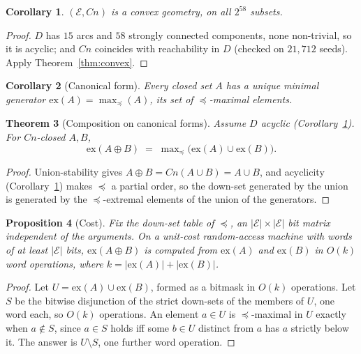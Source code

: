 \documentclass[11pt,reqno]{amsart}
\theoremstyle{plain}
\newtheorem{theorem}{Theorem}[section]
\newtheorem{proposition}[theorem]{Proposition}
\newtheorem{corollary}[theorem]{Corollary}
\theoremstyle{definition}
\theoremstyle{remark}
\newcommand{\El}{\mathcal{E}}
\begin{document}
\begin{corollary}\label{cor:ourconvex}
$(\El, Cn)$ is a convex geometry, on all $2^{58}$ subsets.
\end{corollary}

\begin{proof}
$D$ has $15$ arcs and $58$ strongly connected components, none non-trivial, so it
is acyclic; and $Cn$ coincides with reachability in $D$ (checked on $21{,}712$
seeds). Apply Theorem~\ref{thm:convex}.
\end{proof}

\begin{corollary}[Canonical form]\label{cor:ex}
Every closed set $A$ has a unique minimal generator
$\mathrm{ex}(A) = \max_{\preceq}(A)$, its set of $\preceq$-maximal elements.
\end{corollary}

\begin{theorem}[Composition on canonical forms]\label{thm:excomp}
Assume $D$ acyclic (Corollary~\ref{cor:ourconvex}). For $Cn$-closed $A, B$,
\[
  \mathrm{ex}(A \oplus B) \;=\; \max\nolimits_{\preceq}\bigl(\mathrm{ex}(A) \cup \mathrm{ex}(B)\bigr).
\]
\end{theorem}

\begin{proof}
Union-stability gives $A \oplus B = Cn(A \cup B) = A \cup B$, and acyclicity
(Corollary~\ref{cor:ourconvex}) makes $\preceq$ a partial order, so the down-set
generated by the union is generated by the $\preceq$-extremal elements of the
union of the generators.
\end{proof}

\begin{proposition}[Cost]\label{prop:excost}
Fix the down-set table of $\preceq$, an $|\El| \times |\El|$ bit matrix
independent of the arguments. On a unit-cost random-access machine with words of
at least $|\El|$ bits, $\mathrm{ex}(A \oplus B)$ is computed from
$\mathrm{ex}(A)$ and $\mathrm{ex}(B)$ in $O(k)$ word operations, where
$k = |\mathrm{ex}(A)| + |\mathrm{ex}(B)|$.
\end{proposition}

\begin{proof}
Let $U = \mathrm{ex}(A) \cup \mathrm{ex}(B)$, formed as a bitmask in $O(k)$
operations. Let $S$ be the bitwise disjunction of the strict down-sets of the
members of $U$, one word each, so $O(k)$ operations. An element $a \in U$ is
$\preceq$-maximal in $U$ exactly when $a \notin S$, since $a \in S$ holds iff
some $b \in U$ distinct from $a$ has $a$ strictly below it. The answer is
$U \setminus S$, one further word operation.
\end{proof}
\end{document}
